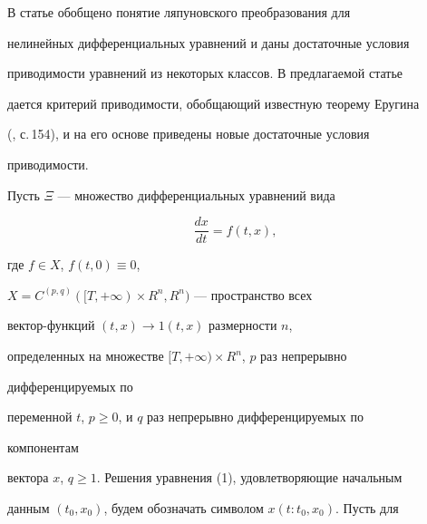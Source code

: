  


\pagestyle{plain} %


 


 




 


\maketitle 


\label{begin} 


 


В статье \cite{1} обобщено понятие ляпуновского преобразования для 


нелинейных дифференциальных уравнений и даны достаточные условия 


приводимости уравнений из некоторых классов. В предлагаемой статье 


дается критерий приводимости, обобщающий известную теорему Еругина 


(\cite{2}, с.\,154), и на его основе приведены новые достаточные условия 


приводимости. 


 


Пусть $\Xi$ --- множество дифференциальных уравнений вида 


\begin{equation} 


\frac{dx}{dt}=f(t,x), 


\end{equation} 


где $f\in X$, $f(t,0)\equiv 0$, 


$X=C^{(p,q)}([T,+\infty)\times R^n,R^n)$ --- пространство всех 


вектор-функций $(t,x)\to 1(t,x)$ размерности $n$, 


определенных на множестве $[T,+\infty)\times R^n$, $p$ раз непрерывно 


дифференцируемых по 


переменной $t$, $p\ge 0$, и $q$ раз непрерывно дифференцируемых по 


компонентам 


вектора $x$, $q\ge 1$. Решения уравнения (1), удовлетворяющие начальным 


данным $(t_0,x_0)$, будем обозначать символом $x(t:t_0,x_0)$. Пусть для 


